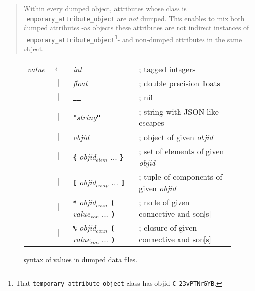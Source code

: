 {\begin{quote}
\begin{small}
         Within every dumped object, attributes whose class is
         \texttt{temporary\_attribute\_object} are \emph{not}
          dumped. This
         enables to mix both dumped attributes -as objects these
         attributes are not indirect instances of
         \texttt{temporary\_attribute\_object}\footnote{That
           \texttt{temporary\_attribute\_object} class has objid
           \texttt{€\_23vPTNrGYB}.}- and non-dumped attributes in the
         same object.
\end{small}
\end{quote}


\begin{figure}[h]
  \begin{center}
  \begin{tabular}{l c l l}
    \emph{value} & $\leftarrow$ & \emph{int} & ; tagged integers \\
                 & $|$ & \emph{float} & ; double precision floats \\
                 & $|$ & \texttt{\textbf{\_\_}} & ; nil \\
                 & $|$ & \texttt{\textbf{"}}\emph{string}\texttt{\textbf{"}} & ; string  {\scriptsize with JSON-like escapes} \\
                 & $|$ & \emph{objid} & ; object  {\scriptsize of given \emph{objid}}\\
                 & $|$ & \texttt{\textbf{\{}} \emph{objid}$_{elem}$ {...} \texttt{\textbf{\}}}  & ; set  {\scriptsize of elements of given \emph{objid}}\\
                 & $|$ & \texttt{\textbf{[}} \emph{objid}$_{comp}$ {...} \texttt{\textbf{]}}  & ; tuple  {\scriptsize of components of given \emph{objid}}\\
                 & $|$ & \texttt{\textbf{*}} \emph{objid}$_{conn}$ \texttt{\textbf{(}} \emph{value}$_{son}$ {...} \texttt{\textbf{)}}  & ; node {\scriptsize of given connective and son[s]}\\
                 & $|$ & \texttt{\textbf{\%}} \emph{objid}$_{conn}$ \texttt{\textbf{(}} \emph{value}$_{son}$ {...} \texttt{\textbf{)}}  & ; closure {\scriptsize of given connective and son[s]}\\
  \end{tabular}
  \end{center}
  \caption{syntax of values in dumped data files.}
  \label{fig:dumpvalsyntax}
\end{figure}

}
